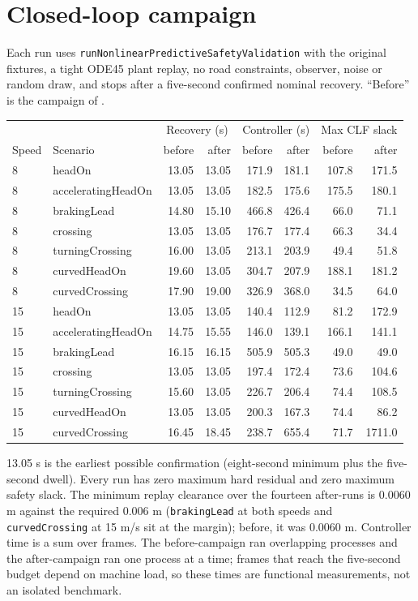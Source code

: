 \documentclass[11pt]{article}
\begin{document}
\section{Closed-loop campaign}
Each run uses \texttt{runNonlinearPredictiveSafetyValidation} with the original
fixtures, a tight ODE45 plant replay, no road constraints, observer, noise or
random draw, and stops after a five-second confirmed nominal recovery.
``Before'' is the campaign of .
\begin{center}
\small
\begin{tabular}{llrrrrrr}
\toprule
 & & \multicolumn{2}{c}{Recovery (s)} & \multicolumn{2}{c}{Controller (s)} & \multicolumn{2}{c}{Max CLF slack} \\
Speed & Scenario & before & after & before & after & before & after \\
\midrule
8 & headOn & 13.05 & 13.05 & 171.9 & 181.1 & 107.8 & 171.5 \\
8 & acceleratingHeadOn & 13.05 & 13.05 & 182.5 & 175.6 & 175.5 & 180.1 \\
8 & brakingLead & 14.80 & 15.10 & 466.8 & 426.4 & 66.0 & 71.1 \\
8 & crossing & 13.05 & 13.05 & 176.7 & 177.4 & 66.3 & 34.4 \\
8 & turningCrossing & 16.00 & 13.05 & 213.1 & 203.9 & 49.4 & 51.8 \\
8 & curvedHeadOn & 19.60 & 13.05 & 304.7 & 207.9 & 188.1 & 181.2 \\
8 & curvedCrossing & 17.90 & 19.00 & 326.9 & 368.0 & 34.5 & 64.0 \\
15 & headOn & 13.05 & 13.05 & 140.4 & 112.9 & 81.2 & 172.9 \\
15 & acceleratingHeadOn & 14.75 & 15.55 & 146.0 & 139.1 & 166.1 & 141.1 \\
15 & brakingLead & 16.15 & 16.15 & 505.9 & 505.3 & 49.0 & 49.0 \\
15 & crossing & 13.05 & 13.05 & 197.4 & 172.4 & 73.6 & 104.6 \\
15 & turningCrossing & 15.60 & 13.05 & 226.7 & 206.4 & 74.4 & 108.5 \\
15 & curvedHeadOn & 13.05 & 13.05 & 200.3 & 167.3 & 74.4 & 86.2 \\
15 & curvedCrossing & 16.45 & 18.45 & 238.7 & 655.4 & 71.7 & 1711.0 \\
\bottomrule
\end{tabular}
\end{center}
13.05 s is the earliest possible confirmation (eight-second minimum plus the
five-second dwell). Every run has zero maximum hard residual and zero maximum
safety slack. The minimum replay clearance over the fourteen after-runs is
0.0060 m against the required 0.006 m (\texttt{brakingLead} at both speeds and
\texttt{curvedCrossing} at 15 m/s sit at the margin); before, it was 0.0060 m.
Controller time is a sum over frames. The before-campaign ran overlapping
processes and the after-campaign ran one process at a time; frames that reach
the five-second budget depend on machine load, so these times are functional
measurements, not an isolated benchmark.
\end{document}
